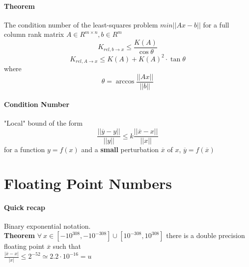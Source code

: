 \documentclass[10pt]{report}
\begin{document}
\paragraph{Theorem} The condition number of the least-squares problem $min||Ax-b||$ for a full column rank matrix $A\in R^{m\times n},b\in R^m$ $$K_{rel,b\rightarrow x }\leq \frac{K(A)}{\cos\theta}$$ $$K_{rel,A\rightarrow x} \leq K(A) + K(A)^2\cdot\tan\theta$$ where $$\theta=\arccos\frac{||Ax||}{||b||}$$
\paragraph{Condition Number} "Local" bound of the form $$\frac{||\overline{y} - y||}{||y||} \leq k\frac{||\overline{x} - x||}{||x||}$$ for a function $y=f(x)$ and a \textbf{small} perturbation $\overline{x}$ of $x$, $\overline{y} = f(\overline{x})$
\section{Floating Point Numbers}
\paragraph{Quick recap} Binary exponential notation.\\
\textbf{Theorem} $\forall\:x\in[-10^{308},-10^{-308}]\cup[10^{-308},10^{308}]$ there is a double precision floating point $\overline{x}$ such that\\$\frac{|\overline{x} - x|}{|x|}\leq 2^{-52} \simeq 2.2\cdot10^{-16}=u$
\end{document}
